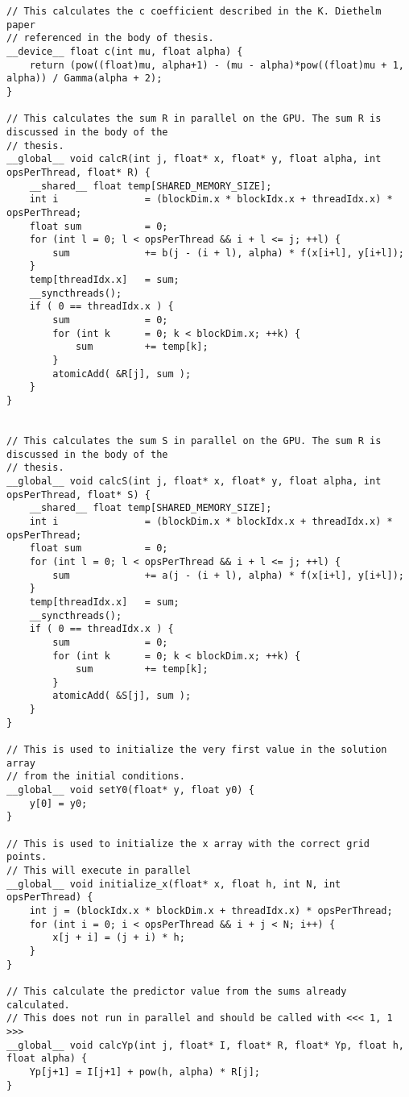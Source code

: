 \begin{lstlisting}
// This calculates the c coefficient described in the K. Diethelm paper
// referenced in the body of thesis.
__device__ float c(int mu, float alpha) {
    return (pow((float)mu, alpha+1) - (mu - alpha)*pow((float)mu + 1, alpha)) / Gamma(alpha + 2);
}

// This calculates the sum R in parallel on the GPU. The sum R is discussed in the body of the
// thesis. 
__global__ void calcR(int j, float* x, float* y, float alpha, int opsPerThread, float* R) {
    __shared__ float temp[SHARED_MEMORY_SIZE];
    int i 			    = (blockDim.x * blockIdx.x + threadIdx.x) * opsPerThread;
    float sum 		    = 0;
	for (int l = 0; l < opsPerThread && i + l <= j; ++l) {
		sum 		    += b(j - (i + l), alpha) * f(x[i+l], y[i+l]);
	}
	temp[threadIdx.x]   = sum;
	__syncthreads();
    if ( 0 == threadIdx.x ) {
        sum             = 0;
        for (int k      = 0; k < blockDim.x; ++k) {
            sum         += temp[k];
        }
        atomicAdd( &R[j], sum );
    }
}


// This calculates the sum S in parallel on the GPU. The sum R is discussed in the body of the
// thesis. 
__global__ void calcS(int j, float* x, float* y, float alpha, int opsPerThread, float* S) {
    __shared__ float temp[SHARED_MEMORY_SIZE];
    int i 			    = (blockDim.x * blockIdx.x + threadIdx.x) * opsPerThread;
    float sum 		    = 0;
	for (int l = 0; l < opsPerThread && i + l <= j; ++l) {
		sum 		    += a(j - (i + l), alpha) * f(x[i+l], y[i+l]);
	}
	temp[threadIdx.x]   = sum;
	__syncthreads();
    if ( 0 == threadIdx.x ) {
        sum             = 0;
        for (int k      = 0; k < blockDim.x; ++k) {
            sum         += temp[k];
        }
        atomicAdd( &S[j], sum );
    }
}

// This is used to initialize the very first value in the solution array
// from the initial conditions.
__global__ void setY0(float* y, float y0) {
    y[0] = y0;
}

// This is used to initialize the x array with the correct grid points.
// This will execute in parallel
__global__ void initialize_x(float* x, float h, int N, int opsPerThread) {
    int j = (blockIdx.x * blockDim.x + threadIdx.x) * opsPerThread;
    for (int i = 0; i < opsPerThread && i + j < N; i++) {
        x[j + i] = (j + i) * h;
    }
}

// This calculate the predictor value from the sums already calculated.
// This does not run in parallel and should be called with <<< 1, 1 >>>
__global__ void calcYp(int j, float* I, float* R, float* Yp, float h, float alpha) {
    Yp[j+1] = I[j+1] + pow(h, alpha) * R[j];
}


\end{lstlisting}
